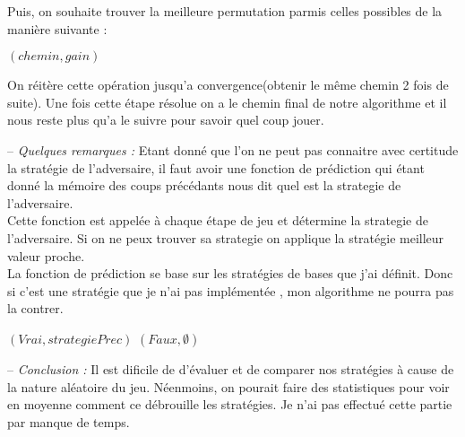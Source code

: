 \documentclass[11pt]{article}
\begin{document}
Puis, on souhaite trouver la meilleure permutation parmis celles possibles de la manière suivante :

\SetAlgoVlined
\begin{algorithm}
    \Retour $(chemin, gain)$
\end{algorithm}

On réitère cette opération jusqu'a convergence(obtenir le même chemin 2 fois de suite).
Une fois cette étape résolue on a le chemin final de notre algorithme et il nous reste plus qu'a le suivre pour savoir quel coup jouer. 

-- {\itshape Quelques remarques :}
Etant donné que l'on ne peut pas connaitre avec certitude la stratégie de l'adversaire, il faut avoir une fonction de prédiction qui étant donné la mémoire des coups précédants nous dit quel est la strategie de l'adversaire. \\
Cette fonction est appelée à chaque étape de jeu et détermine la strategie de l'adversaire. Si on ne peux trouver sa strategie on applique la stratégie meilleur valeur proche. \\
La fonction de prédiction se base sur les stratégies de bases que j'ai définit. Donc si c'est une stratégie que je n'ai pas implémentée , mon algorithme ne pourra pas la contrer.


\SetAlgoVlined
\begin{algorithm}
      {\Retour $(Vrai, strategiePrec)$}
    \Retour $(Faux, \emptyset)$
\end{algorithm}

-- {\itshape Conclusion :}
Il est dificile de d'évaluer et de comparer nos stratégies à cause de la nature aléatoire du jeu. Néenmoins, on pourait faire des statistiques pour voir en moyenne comment ce débrouille les stratégies. Je n'ai pas effectué cette partie par manque de temps.
\end{document}
